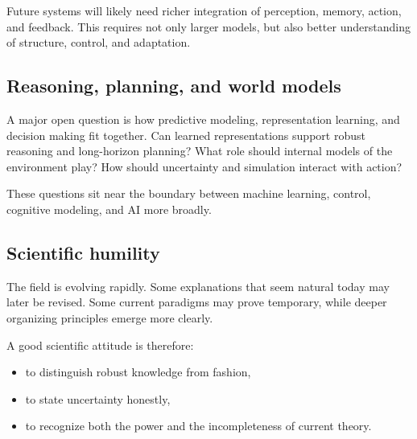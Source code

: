 Future systems will likely need richer integration of perception, memory, action, and feedback.
This requires not only larger models, but also better understanding of structure, control, and adaptation.

\subsection*{Reasoning, planning, and world models}

A major open question is how predictive modeling, representation learning, and decision making fit together.
Can learned representations support robust reasoning and long-horizon planning?
What role should internal models of the environment play?
How should uncertainty and simulation interact with action?

\medskip

These questions sit near the boundary between machine learning, control, cognitive modeling, and AI more broadly.

\subsection*{Scientific humility}

The field is evolving rapidly.
Some explanations that seem natural today may later be revised.
Some current paradigms may prove temporary, while deeper organizing principles emerge more clearly.

\medskip

A good scientific attitude is therefore:
\begin{itemize}
    \item to distinguish robust knowledge from fashion,
    \item to state uncertainty honestly,
    \item to recognize both the power and the incompleteness of current theory.
\end{itemize}

